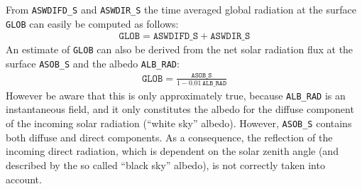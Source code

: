 From \texttt{ASWDIFD\_S} and \texttt{ASWDIR\_S} the time averaged global radiation at the surface \texttt{GLOB} can easily be computed as follows:
\begin{align*}
 \texttt{GLOB} = \texttt{ASWDIFD\_S} + \texttt{ASWDIR\_S}
\end{align*}
An estimate of \texttt{GLOB} can also be derived from the net solar radiation flux at the surface \texttt{ASOB\_S} 
and the albedo \texttt{ALB\_RAD}:
\begin{align*}
 \texttt{GLOB} = \frac{\texttt{ASOB\_S}}{1-0.01\,\texttt{ALB\_RAD}} 
\end{align*}
However be aware that this is only approximately true, because \texttt{ALB\_RAD} is an instantaneous field, and it  
only constitutes the albedo for the diffuse component of the incoming solar radiation (``white sky'' albedo). However, 
\texttt{ASOB\_S} contains both diffuse and direct components. As a consequence, the reflection of the incoming direct 
radiation, which is dependent on the solar zenith angle (and described by the so called ``black sky'' albedo), 
is not correctly taken into account. 



